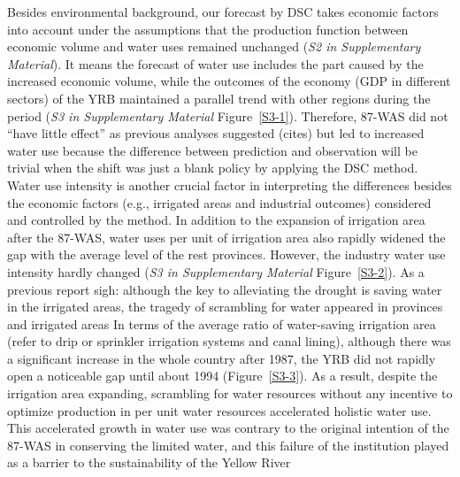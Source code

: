 \label{result-1-p2}
Besides environmental background, our forecast by DSC takes economic factors into account under the assumptions that the production function between economic volume and water uses remained unchanged (\textit{S2 in Supplementary Material}).
It means the forecast of water use includes the part caused by the increased economic volume, while the outcomes of the economy (GDP in different sectors) of the YRB maintained a parallel trend with other regions during the period (\textit{S3 in Supplementary Material} Figure~\ref{S3-1}).
Therefore, 87-WAS did not ``have little effect'' as previous analyses suggested (cites) but led to increased water use because the difference between prediction and observation will be trivial when the shift was just a blank policy by applying the DSC method. %
Water use intensity is another crucial factor in interpreting the differences besides the economic factors (e.g., irrigated areas and industrial outcomes) considered and controlled by the method.
In addition to the expansion of irrigation area after the 87-WAS, water uses per unit of irrigation area also rapidly widened the gap with the average level of the rest provinces. However, the industry water use intensity hardly changed (\textit{S3 in Supplementary Material} Figure~\ref{S3-2}).
As a previous report sigh: although the key to alleviating the drought is saving water in the irrigated areas, the tragedy of scrambling for water appeared in provinces and irrigated areas %
In terms of the average ratio of water-saving irrigation area (refer to drip or sprinkler irrigation systems and canal lining), although there was a significant increase in the whole country after 1987, the YRB did not rapidly open a noticeable gap until about 1994 (Figure~\ref{S3-3}).
As a result, despite the irrigation area expanding, scrambling for water resources without any incentive to optimize production in per unit water resources accelerated holistic water use.
This accelerated growth in water use was contrary to the original intention of the 87-WAS in conserving the limited water, and this failure of the institution played as a barrier to the sustainability of the Yellow River %

